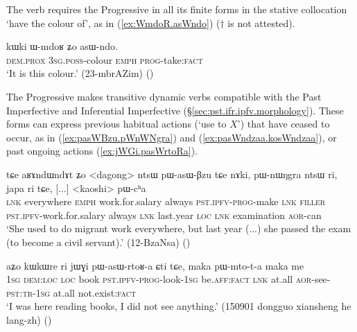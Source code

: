 The verb  requires the Progressive in all its finite forms in the stative collocation  `have the colour of', as in (\ref{ex:WmdoR.asWndo}) ($\dagger$ is not attested).

\begin{exe}
\ex \label{ex:WmdoR.asWndo}
\gll kɯki ɯ-mdoʁ ʑo asɯ-ndo. \\
\textsc{dem}.\textsc{prox} \textsc{3sg}.\textsc{poss}-colour \textsc{emph} \textsc{prog}-take:\textsc{fact} \\
\glt `It is this colour.' (23-mbrAZim) ()
\end{exe}

The Progressive makes transitive dynamic verbs compatible with the Past Imperfective and Inferential Imperfective (§\ref{sec:pst.ifr.ipfv.morphology}). These forms can express previous habitual actions (`use to $X$') that have ceased to occur, as in (\ref{ex:pasWBzu.pWnWNgra}) and (\ref{ex:pasWndzaa.kosWndzaa}), or past ongoing actions (\ref{ex:jWGi.pasWrtoRa}).

\begin{exe}
\ex \label{ex:pasWBzu.pWnWNgra}
\gll tɕe aʁɤndɯndɤt ʑo <dagong> ntsɯ pɯ-asɯ-βzu tɕe nɤki, pɯ-nɯŋgra ntsɯ ri, japa ri tɕe, [...] <kaoshi> pɯ-cʰa \\
\textsc{lnk} everywhere \textsc{emph} work.for.salary always \textsc{pst}.\textsc{ipfv}-\textsc{prog}-make \textsc{lnk} \textsc{filler} \textsc{pst}.\textsc{ipfv}-work.for.salary always \textsc{lnk} last.year \textsc{loc} \textsc{lnk} {  } examination \textsc{aor}-can \\
\glt `She used to do migrant work everywhere, but last year (...) she passed the exam (to become a civil servant).' (12-BzaNsa)
()
\end{exe}

\begin{exe}
\ex \label{ex:jWGi.pasWrtoRa}
\gll aʑo kɯkɯre ri jɯɣi pɯ-asɯ-rtoʁ-a ɕti tɕe, maka pɯ-mto-t-a maka me \\
\textsc{1sg} \textsc{dem}:\textsc{loc} \textsc{loc} book \textsc{pst}.\textsc{ipfv}-\textsc{prog}-look-\textsc{1sg} be.\textsc{aff}:\textsc{fact} \textsc{lnk} at.all \textsc{aor}-see-\textsc{pst}:\textsc{tr}-\textsc{1sg} at.all not.exist:\textsc{fact} \\
\glt `I was here reading books, I did not see anything.' (150901 dongguo xiansheng he lang-zh)
()
\end{exe}

